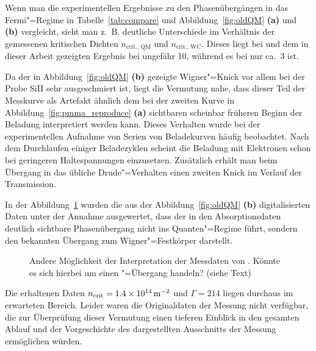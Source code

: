 Wenn man die experimentellen Ergebnisse zu den Phasenübergängen in das Fermi"=Regime in Tabelle~\ref{tab:compare} und Abbildung~\ref{fig:oldQM} {\bfseries (a)} und {\bfseries (b)} vergleicht, sieht man z.\ B. deutliche Unterschiede im Verhältnis der gemessenen kritischen Dichten $n_\text{crit., QM}$ und $n_\text{crit., WC}$. Dieses liegt bei \cite{guenzler} und dem in dieser Arbeit gezeigten Ergebnis bei ungefähr 10, während es bei \cite{Gue96} nur ca.\ 3 ist. 
 
\enlargethispage{\baselineskip}
Da der in Abbildung~\ref{fig:oldQM} {\bfseries (b)} gezeigte Wigner"=Knick vor allem bei der Probe SiII sehr ausgeschmiert ist, liegt die Vermutung nahe, dass dieser Teil der Messkurve als Artefakt ähnlich dem bei der zweiten Kurve in Abbildung~\ref{fig:pmma_reproduce} {\bfseries (a)} sichtbaren scheinbar früheren Beginn der Beladung interpretiert werden kann. Dieses Verhalten wurde bei der experimentellen Aufnahme von Serien von Beladekurven häufig beobachtet. Nach dem Durchlaufen einiger Beladezyklen scheint die Beladung mit Elektronen schon bei geringeren Haltespannungen einzusetzen. Zusätzlich erhält man beim Übergang in das übliche Drude"=Verhalten einen zweiten Knick im Verlauf der Transmission.

In der Abbildung~\ref{fig:qm_wigner} wurden die aus der Abbildung~\ref{fig:oldQM} {\bfseries (b)} digitalisierten Daten unter der Annahme ausgewertet, dass der in den Absorptionsdaten deutlich sichtbare Phasenübergang nicht ins Quanten"=Regime führt, sondern den bekannten Übergang zum Wigner"=Festkörper darstellt.
\begin{figure}[h!tbp]
	\centerline{
	\hfill%
	}
	\caption[Alternative Interpretation der Daten aus \cite{Gue96}]{Andere Möglichkeit der Interpretation der Messdaten von \cite{Gue96}. Könnte es sich hierbei um einen "=Übergang handeln? (siehe Text)}
	\label{fig:qm_wigner}
\end{figure}
\enlargethispage{2\baselineskip}
Die erhaltenen Daten $n_\text{crit}=\unit[1.4\times10^{14}]{\Em}$ und $\Gamma=214$ liegen durchaus im erwarteten Bereich.
Leider waren die Originaldaten der Messung nicht verfügbar, die zur Überprüfung dieser Vermutung einen tieferen Einblick in den gesamten Ablauf und der Vorgeschichte des dargestellten Ausschnitts der Messung ermöglichen würden.
 

